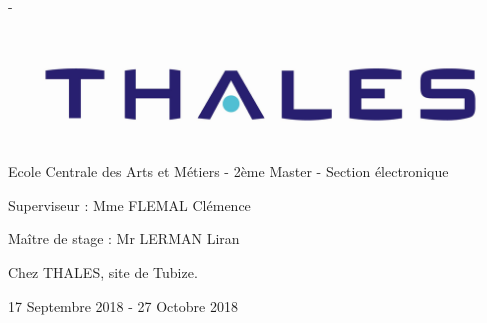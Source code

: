 \begin{titlingpage}
\begin{SingleSpace}
\begin{adjustwidth*}{\unitlength}{-\unitlength}
\begin{center}
\includegraphics[scale=0.3]{logos/Logo-Thales.jpg}\\
\vspace{6mm}
{\large Ecole Centrale des Arts et Métiers - 2ème Master - Section électronique}\\

\vspace{11mm}
      \begin{flushleft} \large
        Superviseur : Mme FLEMAL Clémence

        Maître de stage : Mr LERMAN Liran \\
      \end{flushleft}
\vspace{9mm}

{Chez THALES, site de Tubize.}
\vspace{12mm}
\end{center}

\begin{flushright}
{\small {17 Septembre 2018 - 27 Octobre 2018}}
\end{flushright}

\end{adjustwidth*}
\end{SingleSpace}
\end{titlingpage}